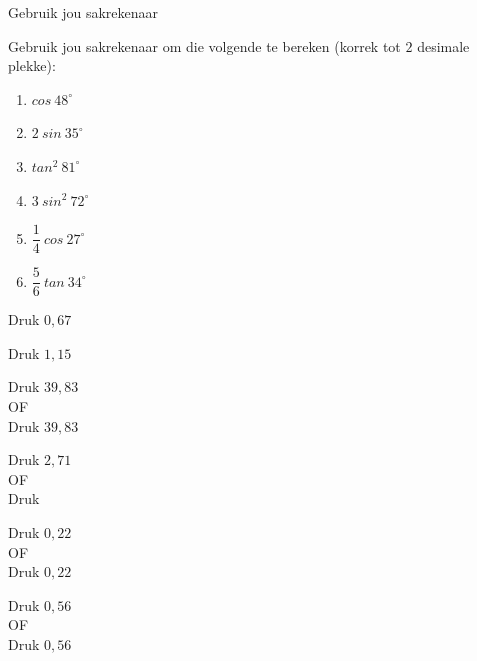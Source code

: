 \begin{wex}{Gebruik jou sakrekenaar}

 {Gebruik jou sakrekenaar om die volgende te bereken (korrek tot $2$ desimale plekke):
\begin{enumerate}[itemsep=4pt, label=\textbf{\arabic*}. ] 
 \item $cos~48^{\circ}$
\item $2~sin~35^{\circ}$
\item $tan^{2}~81^{\circ}$
\item $3~sin^{2}~72^{\circ}$
\item $\dfrac{1}{4}~cos~27^{\circ} $
\item $\dfrac{5}{6}~tan~34^{\circ}$
\end{enumerate}

}
{

\westep{}
Druk   \fbox{\LARGE =} $0,67$

\westep{}
Druk    \fbox{\LARGE =} $1,15$

\westep{}
Druk \fbox{(}   \fbox{)}   \fbox{\LARGE =} $39,83$
\\
OF\\
Druk   \fbox{\LARGE =}   \fbox{\LARGE =} $39,83$

\westep{}
Druk  \fbox{(}   \fbox{)}  \fbox{\LARGE =} $2,71$
\\
OF\\
Druk   \fbox{\LARGE =}   \fbox{\LARGE =}  \fbox{$\times$} 

\westep{}
Druk \fbox{(}  \fbox{$\div$}  \fbox{)}   \fbox{\LARGE =} $0,22$
\\
OF\\
Druk   \fbox{\LARGE =}  \fbox{$\div$}  \fbox{\LARGE =} $0,22$

\westep{}
Druk \fbox{(}  \fbox{$\div$}  \fbox{)}   \fbox{\LARGE =} $0,56$
\\
OF\\
Druk   \fbox{\LARGE =}  \fbox{$\times$}  \fbox{$\div$}  \fbox{\LARGE =} $0,56$

}
\end{wex}


